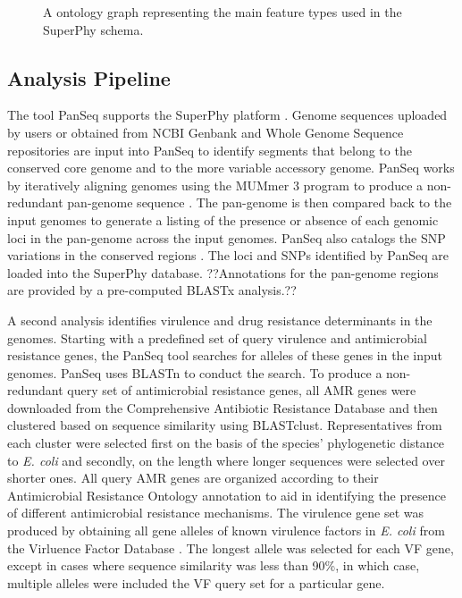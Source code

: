 \documentclass[a4paper,twoside]{article}
\begin{document}
\begin{figure*}[t]
  \vspace{-0.2cm}
  \centering
   {}
  \caption{A ontology graph representing the main feature types used in the SuperPhy schema.}
  \label{fig:ontology}
\end{figure*}

\subsection{Analysis Pipeline}
\label{sec:pipeline}

The tool PanSeq supports the SuperPhy platform \cite{laing_pan-genome_2010}. Genome sequences uploaded by users or obtained from NCBI Genbank and Whole Genome Sequence repositories \cite{benson2013genbank} are input into PanSeq to identify segments that belong to the conserved core genome and to the more variable accessory genome. PanSeq works by iteratively aligning genomes using the MUMmer 3 program to produce a non-redundant pan-genome sequence \cite{laing_pan-genome_2010,kurtz2004versatile}. The pan-genome is then compared back to the input genomes to generate a listing of the presence or absence of each genomic loci in the pan-genome across the input genomes. PanSeq also catalogs the SNP variations in the conserved regions \cite{laing_pan-genome_2010}.  The loci and SNPs identified by PanSeq are loaded into the SuperPhy database. ??Annotations for the pan-genome regions are provided by a pre-computed BLASTx analysis.??

A second analysis identifies virulence and drug resistance determinants in the genomes. Starting with a predefined set of query virulence and antimicrobial resistance genes, the PanSeq tool searches for alleles of these genes in the input genomes. PanSeq uses BLASTn to conduct the search. To produce a non-redundant query set of antimicrobial resistance genes, all AMR genes were downloaded from the Comprehensive Antibiotic Resistance Database \cite{mcarthur2012card} and then clustered based on sequence similarity using BLASTclust. Representatives from each cluster were selected first on the basis of the species' phylogenetic distance to \textit{E. coli} and secondly, on the length where longer sequences were selected over shorter ones. All query AMR genes are organized according to their Antimicrobial Resistance Ontology annotation to aid in identifying the presence of different antimicrobial resistance mechanisms. The virulence gene set was produced by obtaining all gene alleles of known virulence factors in \textit{E. coli} from the Virluence Factor Database \cite{chen2012vfdb,chen2005vfdb}.  The longest allele was selected for each VF gene, except in cases where sequence similarity was less than 90\%, in which case, multiple alleles were included the VF query set for a particular gene.
\end{document}
